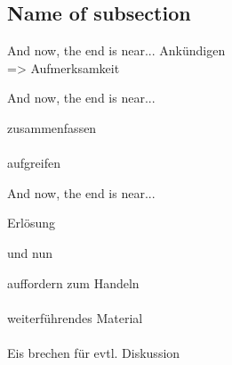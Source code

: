 {\Huge

\subsection{Name of subsection}
\begin{frame}{And now, the end is near...}
\pause
{\center Ankündigen\\}
\pause
\hfill {\small=> Aufmerksamkeit}

\end{frame}


\begin{frame}{And now, the end is near...}
\pause

\begin{center}{

zusammenfassen\\
\ \\\pause
  aufgreifen

}\end{center}

\end{frame}


\begin{frame}{And now, the end is near...}
\begin{center}
Erlösung
\end{center}
\end{frame}


\begin{frame}{und nun}
\pause
\begin{center}
auffordern zum Handeln\pause
\\\ \\
weiterführendes Material
\\\ \\
Eis brechen für evtl. Diskussion
\end{center}

\end{frame}

}

